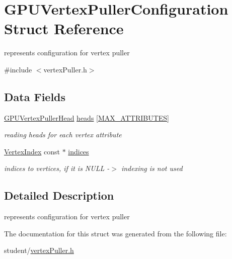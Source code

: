 \hypertarget{structGPUVertexPullerConfiguration}{\section{G\-P\-U\-Vertex\-Puller\-Configuration Struct Reference}
\label{structGPUVertexPullerConfiguration}
}


represents configuration for vertex puller  




{\ttfamily \#include $<$vertex\-Puller.\-h$>$}

\subsection*{Data Fields}
\begin{DoxyCompactItemize}
\item 
\hypertarget{structGPUVertexPullerConfiguration_a10dd09c5b8d5e4e02624c204a81d63b1}{\hyperlink{structGPUVertexPullerHead}{G\-P\-U\-Vertex\-Puller\-Head} \hyperlink{structGPUVertexPullerConfiguration_a10dd09c5b8d5e4e02624c204a81d63b1}{heads} \mbox{[}\hyperlink{fwd_8h_a4d992a1f9192388588184753115f6c03}{M\-A\-X\-\_\-\-A\-T\-T\-R\-I\-B\-U\-T\-E\-S}\mbox{]}}\label{structGPUVertexPullerConfiguration_a10dd09c5b8d5e4e02624c204a81d63b1}

\begin{DoxyCompactList}\small\item\em reading heads for each vertex attribute \end{DoxyCompactList}\item 
\hypertarget{structGPUVertexPullerConfiguration_a1b5b4b90ce478bea0e6a905f74db4497}{\hyperlink{fwd_8h_a83b6b93a31d7fa3fc22f37a3a0798858}{Vertex\-Index} const $\ast$ \hyperlink{structGPUVertexPullerConfiguration_a1b5b4b90ce478bea0e6a905f74db4497}{indices}}\label{structGPUVertexPullerConfiguration_a1b5b4b90ce478bea0e6a905f74db4497}

\begin{DoxyCompactList}\small\item\em indices to vertices, if it is N\-U\-L\-L -\/$>$ indexing is not used \end{DoxyCompactList}\end{DoxyCompactItemize}


\subsection{Detailed Description}
represents configuration for vertex puller 

The documentation for this struct was generated from the following file\-:\begin{DoxyCompactItemize}
\item 
student/\hyperlink{vertexPuller_8h}{vertex\-Puller.\-h}\end{DoxyCompactItemize}
